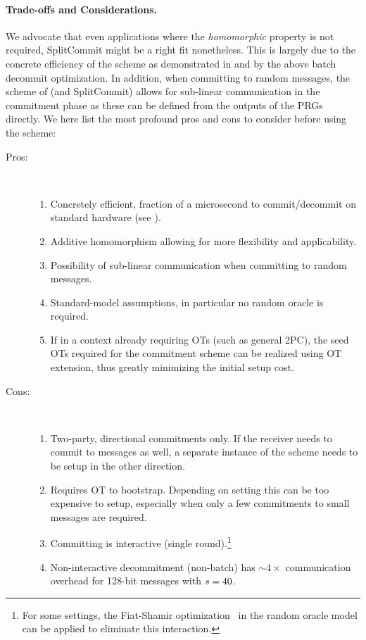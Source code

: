 \paragraph{Trade-offs and Considerations.}
We advocate that even applications where the \textit{homomorphic} property is not required, SplitCommit might be a right fit nonetheless. This is largely due to the concrete efficiency of the scheme as demonstrated in  and by the above batch decommit optimization. In addition, when committing to random messages, the scheme of \cite{DBLP:conf/tcc/FrederiksenJNT16} (and SplitCommit) allows for sub-linear communication in the commitment phase as these can be defined from the outputs of the PRGs directly. We here list the most profound pros and cons to consider before using the scheme:
\begin{description}
  \item[Pros:]
  ~
  \begin{enumerate}
     \item Concretely efficient, fraction of a microsecond to commit/decommit on standard hardware (see ).
     \item Additive homomorphism allowing for more flexibility and applicability.
     \item Possibility of sub-linear communication when committing to random messages.
     \item Standard-model assumptions, in particular no random oracle is required.
     \item If in a context already requiring OTs (such as general 2PC), the seed OTs required for the commitment scheme can be realized using OT extension, thus greatly minimizing the initial setup cost.
   \end{enumerate}
   \item[Cons:]
   ~
   \begin{enumerate}
     \item Two-party, directional commitments only. If the receiver needs to commit to messages as well, a separate instance of the scheme needs to be setup in the other direction.
     \item Requires OT to bootstrap. Depending on setting this can be too expensive to setup, especially when only a few commitments to small messages are required.
     \item Committing is interactive (single round).\footnote{For some settings, the Fiat-Shamir optimization~\cite{DBLP:conf/crypto/FiatS86} in the random oracle model can be applied to eliminate this interaction.}
     \item Non-interactive decommitment (non-batch) has $\sim4\times$ communication overhead for 128-bit messages with $s=40$.\samefootnote
   \end{enumerate}
\end{description}

